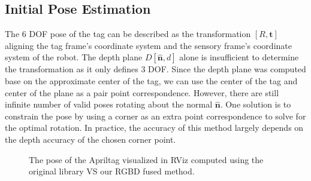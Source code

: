 \subsection{Initial Pose Estimation}
The 6 DOF pose of the tag can be described as the transformation $[R, \boldsymbol{t}]$ aligning the tag frame's coordinate system and the sensory frame's coordinate system of the robot. The depth plane $D [ \boldsymbol{\hat{n}}, d]$ alone is insufficient to determine the transformation as it only defines 3 DOF. Since the depth plane was computed base on the approximate center of the tag, we can use the center of the tag and center of the plane as a pair point correspondence. However, there are still infinite number of valid poses rotating about the normal $\boldsymbol{\hat{n}}$. One solution is to constrain the pose by using a corner as an extra point correspondence to solve for the optimal rotation. In practice, the accuracy of this method largely depends on the depth accuracy of the chosen corner point. 


\begin{figure}
\caption{The pose of the Apriltag visualized in RViz computed using the original library VS our RGBD fused method.}
\label{fig:result_compare}
\end{figure}

